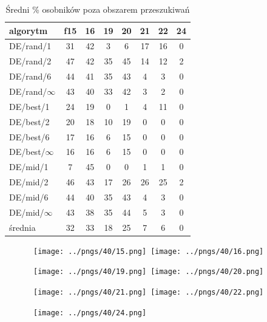 \documentclass[a4paper,onecolumn,oneside,11pt,wide,floatssmall]{mwrep}
\theoremstyle{definition}
\theoremstyle{plain}%
\theoremstyle{remark}
\begin{document}
\begin{table}[H]
\centering
\begin{tabular}{ l | c | c | c | c | c | c | c }
algorytm         &f15& 16& 19& 20& 21& 22& 24 \\ \hline
DE/rand/1	 & 31 & 42 & 3 & 6 & 17 & 16 & 0   \\
DE/rand/2	 & 47 & 42 & 35 & 45 & 14 & 12 & 2   \\
DE/rand/6	 & 44 & 41 & 35 & 43 & 4 & 3 & 0      \\
DE/rand/$\infty$ & 43 & 40 & 33 & 42 & 3 & 2 & 0   \\
DE/best/1	 & 24 & 19 & 0 & 1 & 4 & 11 & 0    \\
DE/best/2	 & 20 & 18 & 10 & 19 & 0 & 0 & 0    \\
DE/best/6	 & 17 & 16 & 6 & 15 & 0 & 0 & 0      \\
DE/best/$\infty$ & 16 & 16 & 6 & 15 & 0 & 0 & 0  \\
DE/mid/1         & 7 & 45 & 0 & 0 & 1 & 1 & 0  \\
DE/mid/2	 & 46 & 43 & 17 & 26 & 26 & 25 & 2   \\
DE/mid/6	 & 44 & 40 & 35 & 43 & 4 & 3 & 0     \\
DE/mid/$\infty$	 & 43 & 38 & 35 & 44 & 5 & 3 & 0    \\ \hline
średnia          & 32 & 33 & 18 & 25 & 7 & 6 & 0 \\  
\end{tabular}
\caption{Średni \% osobników poza obszarem przeszukiwań}
\end{table}

\begin{figure}[H]
\centering
\mbox{
\texttt{[image: ../pngs/40/15.png]} \quad
\texttt{[image: ../pngs/40/16.png]} 
}
\end{figure}

\begin{figure}[H]
\centering
\mbox{
\texttt{[image: ../pngs/40/19.png]} \quad
\texttt{[image: ../pngs/40/20.png]} 
}
\end{figure}

\begin{figure}[H]
\centering
\mbox{
\texttt{[image: ../pngs/40/21.png]} \quad
\texttt{[image: ../pngs/40/22.png]} 
}
\end{figure}

\begin{figure}[H]
\centering
\mbox{
\texttt{[image: ../pngs/40/24.png]} \quad
}
\end{figure}
\end{document}

